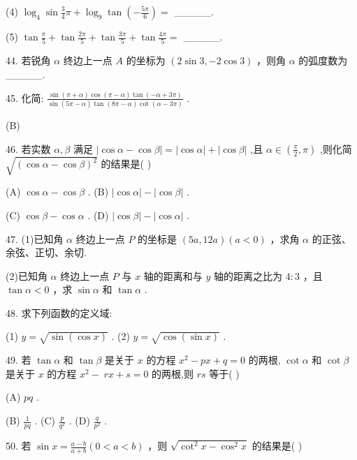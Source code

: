 \documentclass[10pt]{article}
\begin{document}
(4) \({\log }_{4}\sin \frac{3}{4}\pi  + {\log }_{9}\tan \left( {-\frac{5\pi }{6}}\right)  =\) \_\_\_\_\_.

(5) \(\tan \frac{\pi }{5} + \tan \frac{2\pi }{5} + \tan \frac{3\pi }{5} + \tan \frac{4\pi }{5} =\) \_\_\_\_\_.

44. 若锐角 \(\alpha\) 终边上一点 \(A\) 的坐标为 \(\left( {2\sin 3, - 2\cos 3}\right)\) ，则角 \(\alpha\) 的弧度数为\_\_\_\_\_.

45. 化简: \(\frac{\sin \left( {\pi  + \alpha }\right) \cos \left( {\pi  - \alpha }\right) \tan \left( {-\alpha  + {3\pi }}\right) }{\sin \left( {{5\pi } - \alpha }\right) \tan \left( {{8\pi } - \alpha }\right) \cot \left( {\alpha  - {3\pi }}\right) }\) .

(B)

46. 若实数 \(\alpha ,\beta\) 满足 \(\left| {\cos \alpha  - \cos \beta }\right|  = \left| {\cos \alpha }\right|  + \left| {\cos \beta }\right|\) ,且 \(\alpha  \in  \left( {\frac{\pi }{2},\pi }\right)\) ,则化简 \(\sqrt{{\left( \cos \alpha  - \cos \beta \right) }^{2}}\) 的结果是( )

(A) \(\cos \alpha  - \cos \beta\) . (B) \(\left| {\cos \alpha }\right|  - \left| {\cos \beta }\right|\) .

(C) \(\cos \beta  - \cos \alpha\) . (D) \(\left| {\cos \beta }\right|  - \left| {\cos \alpha }\right|\) .

47. (1)已知角 \(\alpha\) 终边上一点 \(P\) 的坐标是 \(\left( {{5a},{12a}}\right) \left( {a < 0}\right)\) ，求角 \(\alpha\) 的正弦、余弦、正切、余切.

(2)已知角 \(\alpha\) 终边上一点 \(P\) 与 \(x\) 轴的距离和与 \(y\) 轴的距离之比为 \(4 : 3\) ，且 \(\tan \alpha  < 0\) ，求 \(\sin \alpha\) 和 \(\tan \alpha\) .

48. 求下列函数的定义域:

(1) \(y = \sqrt{\sin \left( {\cos x}\right) }\) . (2) \(y = \sqrt{\cos \left( {\sin x}\right) }\) .

49. 若 \(\tan \alpha\) 和 \(\tan \beta\) 是关于 \(x\) 的方程 \({x}^{2} - {px} + q = 0\) 的两根, \(\cot \alpha\) 和 \(\cot \beta\) 是关于 \(x\) 的方程 \({x}^{2} - \; {rx} + s = 0\) 的两根,则 \({rs}\) 等于( )

(A) \({pq}\) .

(B) \(\frac{1}{pq}\) . (C) \(\frac{p}{{q}^{2}}\) . (D) \(\frac{q}{{p}^{2}}\) .

50. 若 \(\sin x = \frac{a - b}{a + b}\left( {0 < a < b}\right)\) ，则 \(\sqrt{{\cot }^{2}x - {\cos }^{2}x}\) 的结果是( )
\end{document}
